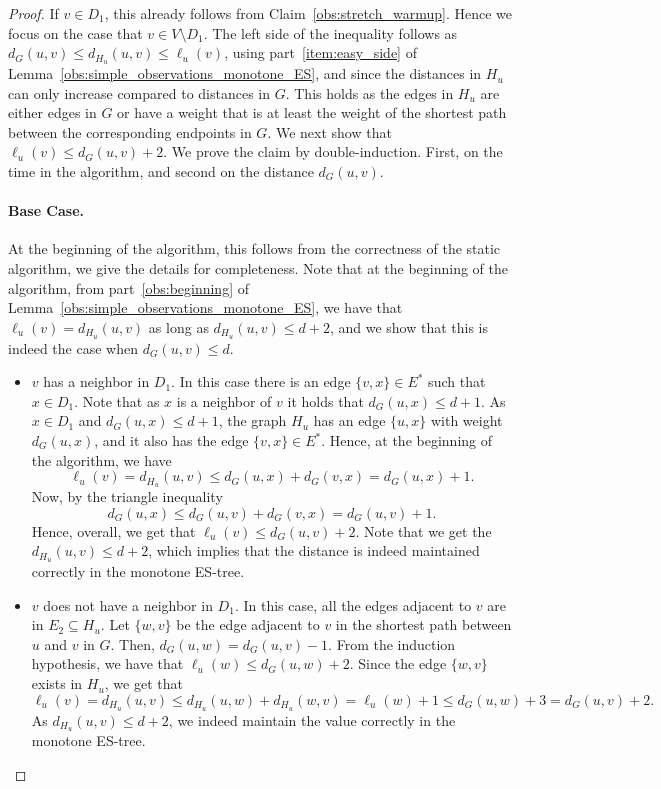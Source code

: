 \begin{proof}
If $v \in D_1$, this already follows from Claim~\ref{obs:stretch_warmup}. Hence we focus on the case that $v \in V \setminus D_1$. The left side of the inequality follows as $d_G(u,v) \leq d_{H_u}(u,v) \leq \ell_u(v)$, using part~\ref{item:easy_side} of Lemma~\ref{obs:simple_observations_monotone_ES}, and since the distances in $H_u$ can only increase compared to distances in $G$. This holds as the edges in $H_u$ are either edges in $G$ or have a weight that is at least the weight of the shortest path between the corresponding endpoints in $G$.
We next show that $\ell_u(v) \leq d_G(u,v) +2$.
We prove the claim by double-induction. First, on the time in the algorithm, and second on the distance $d_G(u,v)$.

\paragraph{Base Case.} At the beginning of the algorithm, this follows from the correctness of the static algorithm, we give the details for completeness. Note that at the beginning of the algorithm, from part~\ref{obs:beginning} of Lemma~\ref{obs:simple_observations_monotone_ES}, we have that $\ell_u(v)=d_{H_u}(u,v)$ as long as $d_{H_u}(u,v) \leq d+2$, and we show that this is indeed the case when $d_G(u,v) \leq d$. 

\begin{itemize}
    \item [Case 1:] $v$ has a neighbor in $D_1$. In this case there is an edge $\{v,x\} \in E^*$ such that $x \in D_1$. Note that as $x$ is a neighbor of $v$ it holds that $d_G(u,x) \leq d+1$. As $x \in D_1$ and $d_G(u,x) \leq d+1$, the graph $H_u$ has an edge $\{u,x\}$ with weight $d_G(u,x)$, and it also has the edge $\{v,x\} \in E^*$. Hence, at the beginning of the algorithm, we have $$\ell_u(v) = d_{H_u}(u,v) \leq d_G(u,x) + d_G(v,x) = d_G(u,x)+1.$$ Now, by the triangle inequality $$d_G(u,x) \leq d_G(u,v)+d_G(v,x)=d_G(u,v)+1.$$ Hence, overall, we get that $\ell_u(v) \leq d_G(u,v) +2$. Note that we get the $d_{H_u}(u,v) \leq d+2$, which implies that the distance is indeed maintained correctly in the monotone ES-tree.
    \item [Case 2:] $v$ does not have a neighbor in $D_1$. In this case, all the edges adjacent to $v$ are in $E_2 \subseteq H_u$. Let $\{w,v\}$ be the edge adjacent to $v$ in the shortest path between $u$ and $v$ in $G$. Then, $d_G(u,w) = d_G(u,v)-1$. From the induction hypothesis, we have that $\ell_u(w) \leq d_G(u,w) +2$. Since the edge $\{w,v\}$ exists in $H_u$, we get that $$\ell_u(v) = d_{H_u}(u,v) \leq d_{H_u}(u,w) + d_{H_u}(w,v)= \ell_u(w)+1 \leq d_G(u,w)+3 = d_G(u,v) + 2.$$ As $d_{H_u}(u,v) \leq d+2$, we indeed maintain the value correctly in the monotone ES-tree.
\end{itemize}



\end{proof}
